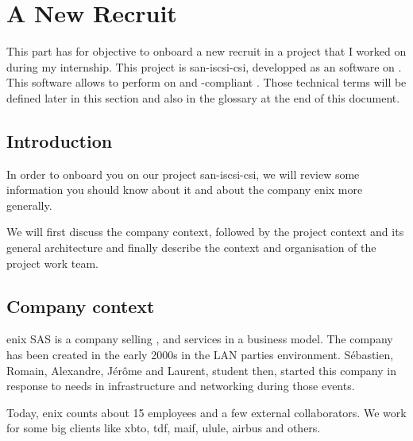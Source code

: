 \chapter{A New Recruit}


This part has for objective to onboard a new recruit in a project that I worked on during my internship. This project is \gls{san-iscsi-csi}, developped as an  software on . This software allows to perform  on  and -compliant . Those technical terms will be defined later in this section and also in the glossary at the end of this document.

\clearpage

\section{Introduction}

In order to onboard you on our project \gls{san-iscsi-csi}, we will review some information you should know about it and about the company \gls{enix} more generally.

We will first discuss the company context, followed by the project context and its general architecture and finally describe the context and organisation of the project work team.

\section{Company context}

\gls{enix} SAS is a company selling ,  and  services in a  business model. The company has been created in the early 2000s in the LAN parties environment. Sébastien, Romain, Alexandre, Jérôme and Laurent, student then, started this company in response to needs in infrastructure and networking during those events.

Today, \gls{enix} counts about 15 employees and a few external collaborators. We work for some big clients like \gls{xbto}, \gls{tdf}, \gls{maif}, \gls{ulule}, \gls{airbus} and others.


